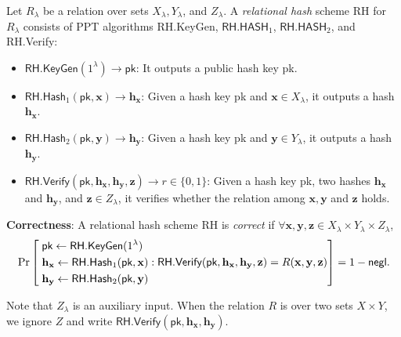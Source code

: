 \begin{definition}
\label{def:rh}
	Let $R_\lambda$ be a relation over sets $X_\lambda, Y_\lambda$, and $ Z_\lambda$. A \emph{relational hash} scheme \textsf{RH} for $R_\lambda$ consists of PPT algorithms \textsf{RH.KeyGen}, $\textsf{RH.HASH}_1$, $\textsf{RH.HASH}_2$, and \textsf{RH.Verify}:
	
	\begin{itemize}
	
		\item $\textsf{RH.KeyGen}(1^\lambda) \to \textsf{pk}$: It outputs a public hash key \textsf{pk}.  
			
		\item $\textsf{RH.Hash}_1(\textsf{pk}, \mathbf{x}) \to \mathbf{h_x}$: Given a hash key \textsf{pk} and $\mathbf{x} \in X_\lambda$, it outputs a hash $\mathbf{h_x}$.

		\item $\textsf{RH.Hash}_2(\textsf{pk}, \mathbf{y}) \to \mathbf{h_y}$: Given a hash key \textsf{pk} and $\mathbf{y} \in Y_\lambda$, it outputs a hash $\mathbf{h_y}$.

		\item $\textsf{RH.Verify}(\textsf{pk}, \mathbf{h_x}, \mathbf{h_y}, \mathbf{z}) \to r \in \{0, 1\}$: Given a hash key \textsf{pk}, two hashes $\mathbf{h_x}$ and $\mathbf{h_y}$, and $\mathbf{z} \in Z_\lambda$, it verifies whether the relation among $\mathbf{x}, \mathbf{y}$ and $\mathbf{z}$ holds.

	\end{itemize}

	\noindent \textbf{Correctness}: A relational hash scheme \textsf{RH} is \emph{correct} if $\forall \mathbf{x}, \mathbf{y}, \mathbf{z} \in X_\lambda \times Y_\lambda \times Z_\lambda$,
	\[
		\Pr \left [
			\begin{aligned} 
				 &\; \textsf{pk} \gets \textsf{RH.KeyGen}(1^\lambda) \\
				 &\; \mathbf{h_x} \gets \textsf{RH.Hash}_1(\textsf{pk}, \mathbf{x}) \\
				 &\; \mathbf{h_y} \gets \textsf{RH.Hash}_2(\textsf{pk}, \mathbf{y})
			\end{aligned} :
			\textsf{RH.Verify}(\textsf{pk}, \mathbf{h_x}, \mathbf{h_y}, \mathbf{z}) = R(\mathbf{x}, \mathbf{y}, \mathbf{z})
			\right ] = 1 - \mathsf{negl}.
	\]
\end{definition}

\noindent Note that $Z_\lambda$ is an auxiliary input. When the relation $R$ is over two sets $X \times Y$, we ignore $Z$ and write $\textsf{RH.Verify}(\textsf{pk}, \mathbf{h_x}, \mathbf{h_y})$.

